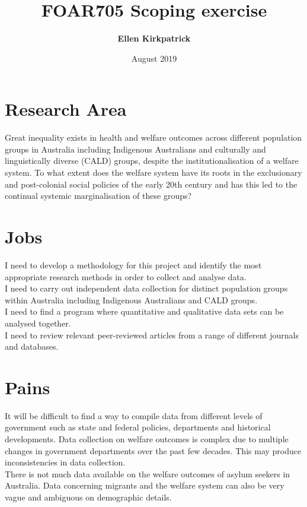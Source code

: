 \documentclass{article}
\title{\textbf{FOAR705 Scoping exercise}}
\author{\textbf{Ellen Kirkpatrick} }
\date{August 2019}
\begin{document}
\maketitle
\section{Research Area}
Great inequality exists in health and welfare outcomes across different population groups in Australia including Indigenous Australians and culturally and linguistically diverse (CALD) groups, despite the institutionalisation of a welfare system. To what extent does the welfare system have its roots in the exclusionary and post-colonial social policies of the early 20th century and has this led to the continual systemic marginalisation of these groups?

\section{Jobs}
I need to develop a methodology for this project and identify the most appropriate research methods in order to collect and analyse data.\\

I need to carry out independent data collection for distinct population groups within Australia including Indigenous Australians and CALD groups. \\

I need to find a program where quantitative and qualitative data sets can be analysed together.\\

I need to review relevant peer-reviewed articles from a range of different  journals and databases. 

\section {Pains}
It will be difficult to find a way to compile data from different levels of government such as state and federal policies, departments and historical developments. Data collection on welfare outcomes is complex due to multiple changes in government departments over the past few decades. This may produce inconsistencies in data collection. \\

There is not much data available on the welfare outcomes of asylum seekers in Australia. Data concerning migrants and the welfare system can also be very vague and ambiguous on demographic details.\\
\end{document}
